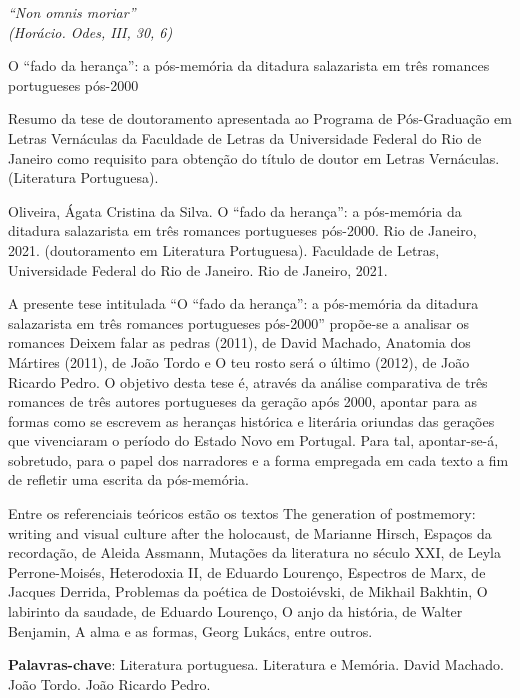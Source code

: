 \documentclass[
	12pt,				%
	oneside,
	a4paper,			%
	english,			%
	spanish,			%
	brazil				%
	]{abntex2}
\begin{document}

\begin{epigrafe}
    \vspace*{\fill}
	\begin{flushright}
		\textit{
		``Non omnis moriar'' \\
		(Horácio. Odes, III, 30, 6)
	}
	\end{flushright}
\end{epigrafe}


\setlength{\absparsep}{18pt} %
\begin{resumo}
O “fado da herança”: a pós-memória da ditadura salazarista em três romances portugueses pós-2000

Resumo da tese de doutoramento apresentada ao Programa de Pós-Graduação em Letras Vernáculas da Faculdade de Letras da Universidade Federal do Rio de Janeiro como requisito para obtenção do título de doutor em Letras Vernáculas. (Literatura Portuguesa). 

Oliveira, Ágata Cristina da Silva. O “fado da herança”: a pós-memória da ditadura salazarista em três romances portugueses pós-2000. Rio de Janeiro, 2021. (doutoramento em Literatura Portuguesa). Faculdade de Letras, Universidade Federal do Rio de Janeiro. Rio de Janeiro, 2021.


A presente tese intitulada “O “fado da herança”: a pós-memória da ditadura salazarista em três romances portugueses pós-2000” propõe-se a analisar os romances Deixem falar as pedras (2011), de David Machado, Anatomia dos Mártires (2011), de João Tordo e O teu rosto será o último (2012), de João Ricardo Pedro. O objetivo desta tese é, através da análise comparativa de três romances de três autores portugueses da geração após 2000, apontar para as formas como se escrevem as heranças histórica e literária oriundas das gerações que vivenciaram o período do Estado Novo em Portugal. Para tal, apontar-se-á, sobretudo, para o papel dos narradores e a forma empregada em cada texto a fim de refletir uma escrita da pós-memória. 

Entre os referenciais teóricos estão os textos The generation of postmemory: writing and visual culture after the holocaust, de Marianne Hirsch, Espaços da recordação, de Aleida Assmann, Mutações da literatura no século XXI, de Leyla Perrone-Moisés, Heterodoxia II, de Eduardo Lourenço, Espectros de Marx, de Jacques Derrida, Problemas da poética de Dostoiévski, de Mikhail Bakhtin, O labirinto da saudade, de Eduardo Lourenço, O anjo da história, de Walter Benjamin, A alma e as formas, Georg Lukács, entre outros. 



 \textbf{Palavras-chave}: Literatura portuguesa. Literatura e Memória. David Machado. João Tordo. João Ricardo Pedro.
\end{resumo}
\end{document}
